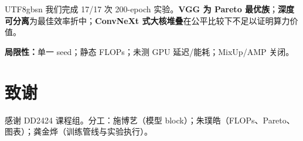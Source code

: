 \documentclass{article}
\renewenvironment{ack}{\section*{致谢}}{}
\begin{document}
\begin{CJK}{UTF8}{gbsn}
我们完成 17/17 次 200-epoch 实验。\textbf{VGG 为 Pareto 最优族}；\textbf{深度可分离}为最佳效率折中；\textbf{ConvNeXt 式大核堆叠}在公平比较下不足以证明算力价值。

\textbf{局限性：}单一 seed；静态 FLOPs；未测 GPU 延迟/能耗；MixUp/AMP 关闭。

\begin{ack}
  感谢 DD2424 课程组。分工：施博艺（模型 block）；朱璞皓（FLOPs、Pareto、图表）；龚金烨（训练管线与实验执行）。
\end{ack}




\end{CJK}
\end{document}

